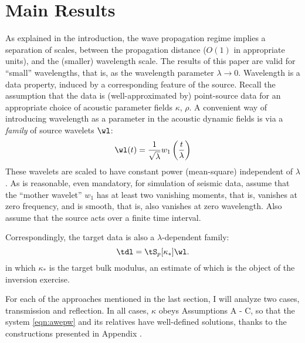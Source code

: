 \section{Main Results}

As explained in the introduction, the wave propagation regime implies
a separation of scales, between the propagation distance ($O(1)$ in
appropriate units), and the (smaller) wavelength scale. The results of
this paper are valid for ``small'' wavelengths, that is, as the
wavelength parameter $\lambda \rightarrow 0$. Wavelength is a data
property, induced by a corresponding feature of the source. Recall
the assumption that the data is (well-approximated by) point-source
data for an appropriate choice of acoustic parameter fields $\kappa$,
$\rho$. A convenient way of introducing wavelength as a parameter in
the acoustic dynamic fields is via a {\em family} of source wavelets $\wl$:
\[
\wl(t)=\frac{1}{\sqrt{\lambda}}w_1\left(\frac{t}{\lambda}\right)
\]
These wavelets are scaled to have constant power (mean-square)
independent of $\lambda$. As is reasonable, even mandatory, for simulation of seismic data, 
assume that the ``mother wavelet'' $w_1$ has at least two vanishing 
moments, that is, vanishes at zero frequency, and is smooth, that is,
also vanishes at zero wavelength. Also assume that the source acts
over a finite time interval.

Correspondingly, the target data is also a $\lambda$-dependent family:
\begin{equation}
  \label{eqn:datadef}
  \tdl = \tS_p[\kappa_*]\wl.
\end{equation}
in which $\kappa_*$ is the target bulk modulus, an estimate of which
is the object of the inversion exercise.

For each of the approaches mentioned in the last section, I will
analyze two cases, transmission and reflection. In all cases, $\kappa$
obeys Assumptions A - C, so that the system \ref{eqn:awepw} and its relatives have
well-defined solutions, thanks to the constructions presented in
Appendix \appSingular. 

